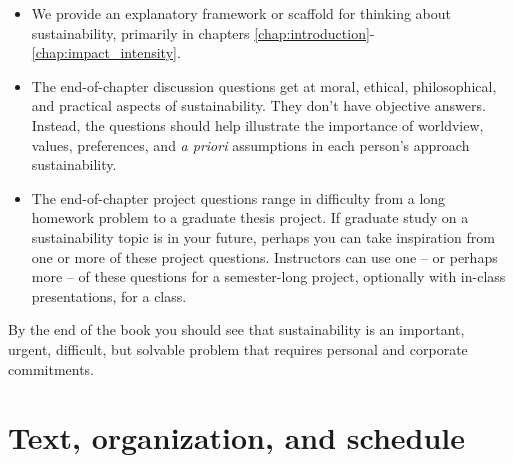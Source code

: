 {\begin{itemize}
  \item We provide an explanatory framework or scaffold for thinking about sustainability,
        primarily in chapters \ref{chap:introduction}-\ref{chap:impact_intensity}.

  \item The end-of-chapter discussion questions get at moral, ethical, philosophical,
        and practical aspects of sustainability. 
        They don't have %
        objective answers. 
        Instead, the questions should help illustrate the importance
        of worldview, values, preferences, and \emph{a priori} assumptions 
        in each person's approach sustainability. 
        
  \item The end-of-chapter project questions range in difficulty from a long
        homework problem to a graduate thesis project. 
        If graduate study on a sustainability topic is in your future, perhaps you can 
        take inspiration from one or more of these project questions. 
        Instructors can use one -- or perhaps more -- of these questions for a 
        semester-long project, optionally with in-class presentations, for a class.
      
\end{itemize}

By the end of the book you should see that sustainability is an important, 
urgent, difficult, but solvable problem that requires personal and corporate 
commitments. 


\section*{Text, organization, and schedule} 

}
